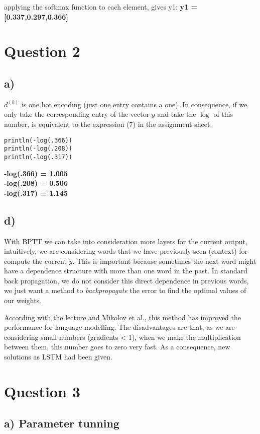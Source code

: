 \documentclass{article}
\begin{document}
applying the softmax function to each element, gives y1:
\textbf{y1 = [0.337,0.297,0.366]}


\section{Question 2}

\subsection*{a)}
$d^{(k)}$ is one hot encoding (just one entry contains a one). In consequence, if we only take the corresponding entry of the vector $y$ and take the $\log$ of this number, is equivalent to the expression (7) in the assignment sheet.

\begin{lstlisting}
println(-log(.366))
println(-log(.208))
println(-log(.317))
\end{lstlisting}
\textbf{-log(.366) = 1.005} \\
\textbf{-log(.208) = 0.506} \\
\textbf{-log(.317) = 1.145} \\

\subsection*{d)}
With BPTT we can take into consideration more layers for the current output, intuitively, we are considering words that we have previously seen (context) for compute the current  $\widehat{y}$. This is important because sometimes the next word might have a dependence structure with more than one word in the past. In standard back propagation, we do not consider this direct dependence in previous words, we just want a method to \textit{backpropagate} the error to find the optimal values of our weights. 

According with the lecture and Mikolov et al., this method has improved the performance for language modelling. The disadvantages are that, as we are considering small numbers (gradients < 1), when we make the multiplication between them, this number goes to zero very fast. As a consequence, new solutions as LSTM had been given.

\newpage
\section{Question 3}
\subsection*{a) Parameter tunning}
\end{document}
